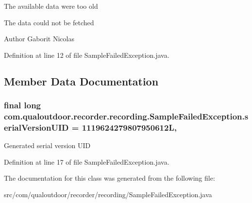 \begin{DoxyItemize}
\item The available data were too old
\item The data could not be fetched
\end{DoxyItemize}

\begin{DoxyAuthor}{Author}
Gaborit Nicolas 
\end{DoxyAuthor}


Definition at line 12 of file Sample\-Failed\-Exception.\-java.



\subsection{Member Data Documentation}
\hypertarget{classcom_1_1qualoutdoor_1_1recorder_1_1recording_1_1SampleFailedException_aac89010927721f39ee2fe9df4f7617c0}{
\subsubsection[{serial\-Version\-U\-I\-D}]{\setlength{\rightskip}{0pt plus 5cm}final long com.\-qualoutdoor.\-recorder.\-recording.\-Sample\-Failed\-Exception.\-serial\-Version\-U\-I\-D = 1119624279807950612\-L\hspace{0.3cm}{\ttfamily [static]}, {\ttfamily [private]}}}\label{classcom_1_1qualoutdoor_1_1recorder_1_1recording_1_1SampleFailedException_aac89010927721f39ee2fe9df4f7617c0}
Generated serial version U\-I\-D 

Definition at line 17 of file Sample\-Failed\-Exception.\-java.



The documentation for this class was generated from the following file\-:\begin{DoxyCompactItemize}
\item 
src/com/qualoutdoor/recorder/recording/Sample\-Failed\-Exception.\-java\end{DoxyCompactItemize}

